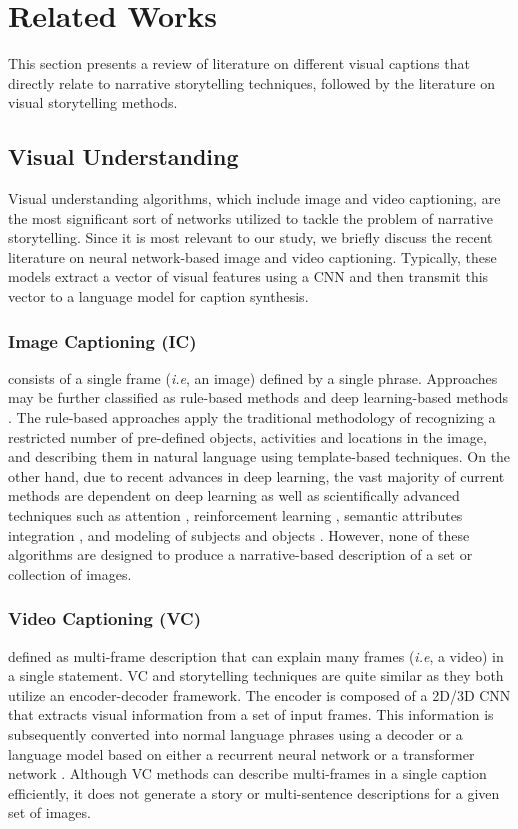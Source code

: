 \documentclass[runningheads]{llncs}
\begin{document}
\section{Related Works}
This section presents a review of literature on different visual captions that directly relate to narrative storytelling techniques, followed by the literature on visual storytelling methods.

\subsection{Visual Understanding}
Visual understanding algorithms, which include image and video captioning, are the most significant sort of networks utilized to tackle the problem of narrative storytelling. Since it is most relevant to our study, we briefly discuss the recent literature on neural network-based image and video captioning. Typically, these models extract a vector of visual features using a CNN and then transmit this vector to a language model for caption synthesis. \subsubsection{Image Captioning (IC)}consists of a single frame (\emph{i.e}, an image) defined by a single phrase. Approaches may be further classified as rule-based methods \cite{do2020reference,mogadala2020integrating} and deep learning-based methods \cite{phukan2020efficient,huang2019attention}. The rule-based approaches apply the traditional methodology of recognizing a restricted number of pre-defined objects, activities and locations in the image, and describing them in natural language using template-based techniques. On the other hand, due to recent advances in deep learning, the vast majority of current methods are dependent on deep learning as well as scientifically advanced techniques such as attention \cite{wang2020learning}, reinforcement learning \cite{shen2020remote}, semantic attributes integration \cite{li2019entangled}, and modeling of subjects and objects \cite{ding2019image}. However, none of these algorithms are designed to produce a narrative-based description of a set or collection of images. 


\subsubsection{Video Captioning (VC)}defined as multi-frame description that can explain many frames (\emph{i.e}, a video) in a single statement. VC and storytelling techniques are quite similar as they both utilize an encoder-decoder framework. The encoder is composed of a 2D/3D CNN that extracts visual information from a set of input frames. This information is subsequently converted into normal language phrases using a decoder or a language model based on either a recurrent neural network \cite{cho2014properties,pang2022video} or a transformer network \cite{zhou2018end,li2022long,jiang2022double}. Although VC methods can describe multi-frames in a single caption efficiently, it does not generate a story or multi-sentence descriptions for a given set of images.
\end{document}
